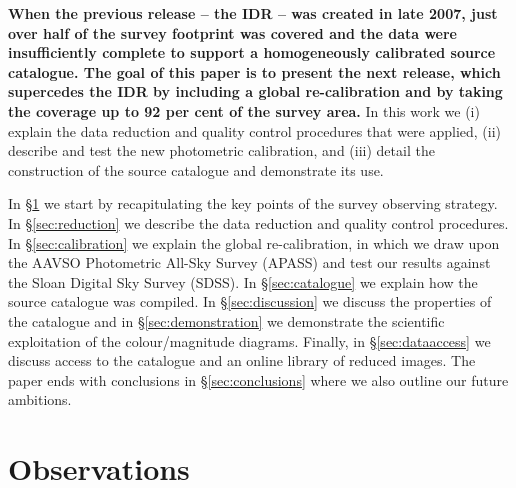 \documentclass[a4paper,useAMS,usenatbib]{mn2e}
\begin{document}
{\bf When the previous release -- the IDR -- was created in late 2007,
just over half of the survey footprint was covered
and the data were insufficiently complete 
to support a homogeneously calibrated source catalogue.
The goal of this paper is to present the next release, 
 which supercedes the IDR by including a global re-calibration
and by taking the coverage up to 92 per cent of the survey area.}
In this work we
(i) explain the data reduction 
and quality control procedures that were applied,
(ii) describe and test the new photometric calibration, and 
(iii) detail the construction of the source catalogue
and demonstrate its use.

In \S\ref{sec:observations} we start by recapitulating the key points
of the survey observing strategy.
In \S\ref{sec:reduction} we describe the data reduction
and quality control procedures.
In \S\ref{sec:calibration} we explain the global re-calibration, in which
we draw upon the AAVSO Photometric All-Sky Survey (APASS)
and test our results against the Sloan Digital Sky Survey (SDSS).
In \S\ref{sec:catalogue} we explain how the source catalogue was compiled.
In \S\ref{sec:discussion} we discuss the properties of the catalogue
and in \S\ref{sec:demonstration} we demonstrate
the scientific exploitation of the colour/magnitude diagrams.
Finally, in \S\ref{sec:dataaccess} we discuss access
to the catalogue and an online library of reduced images.
The paper ends with conclusions in \S\ref{sec:conclusions} where we also outline
our future ambitions.

\section{Observations}
\label{sec:observations}
\end{document}
